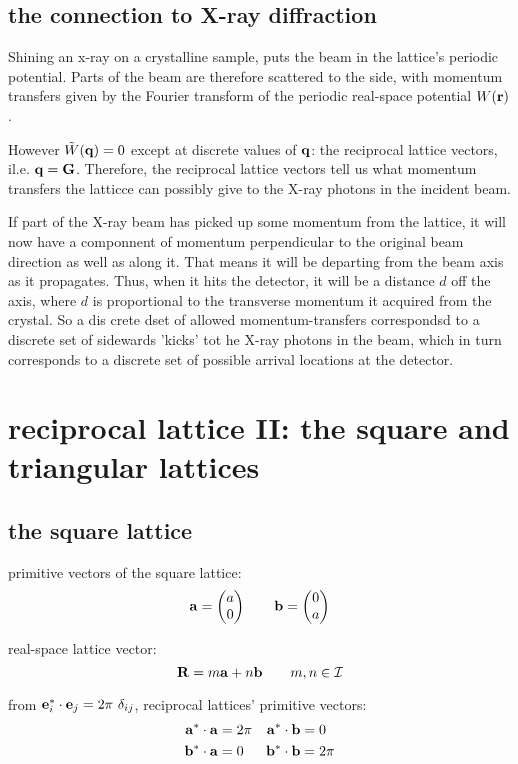\documentclass[10pt, a4paper, twocolumn]{article}
\begin{document}
\subsection{the connection to X-ray diffraction}

Shining an x-ray on a crystalline sample, puts the beam in the lattice's periodic potential. Parts of the beam are therefore scattered to the side, with momentum transfers given by the Fourier transform of the periodic real-space potential $W(\vb r)$.

However $\tilde W (\vb q)=0$ except at discrete values of $\vb q$: the reciprocal lattice vectors, il.e. $\vb q =\vb G$. Therefore, the reciprocal lattice vectors tell us what momentum transfers the latticce can possibly give to the X-ray photons in the incident beam.

If part of the X-ray beam has picked up some momentum from the lattice, it will now have a componnent of momentum perpendicular to the original beam direction as well as along it. That means it will be departing from the beam axis as it propagates. Thus, when it hits the detector, it will be a distance $d$ off the axis, where $d$ is proportional to the transverse momentum it acquired from the crystal. So a dis crete dset of allowed momentum-transfers correspondsd to a discrete set of sidewards 'kicks' tot he X-ray photons in the beam, which in turn corresponds to a discrete set of possible arrival locations at the detector.

\section{reciprocal lattice II: the square and triangular lattices}

\subsection{the square lattice}
primitive vectors of the square lattice:
\[ \vb a= \pmqty{a\\0} \qquad \vb b= \pmqty{0\\a} \]

real-space lattice vector:
\[\vb R = m\vb a + n \vb b \qquad m, n \in \mathcal{I} \]

from $\vb e_i^*\cdot \vb e_j =2\pi\ \delta _{ij}$, reciprocal lattices' primitive vectors:
\begin{equation*}
\begin{aligned}
\vb a^*\cdot \vb a &=2\pi & \vb a^*\cdot \vb b &=0
\\ \vb b^*\cdot \vb a &=0 & \vb b^*\cdot \vb b &=2\pi
\end{aligned}
\end{equation*}
\end{document}
